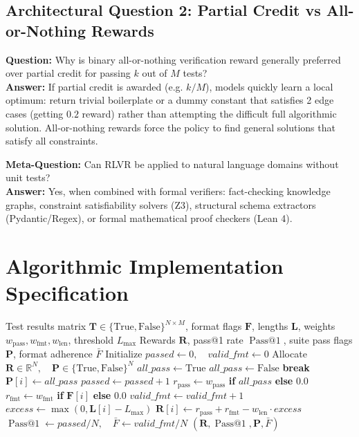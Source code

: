 \documentclass[11pt,a4paper]{article}
\theoremstyle{definition}
\begin{document}
\subsection{Architectural Question 2: Partial Credit vs All-or-Nothing Rewards}
\textbf{Question:} Why is binary all-or-nothing verification reward generally preferred over partial credit for passing $k$ out of $M$ tests?\\
\textbf{Answer:} If partial credit is awarded (e.g. $k/M$), models quickly learn a local optimum: return trivial boilerplate or a dummy constant that satisfies 2 edge cases (getting $0.2$ reward) rather than attempting the difficult full algorithmic solution. All-or-nothing rewards force the policy to find general solutions that satisfy all constraints.

\textbf{Meta-Question:} Can RLVR be applied to natural language domains without unit tests?\\
\textbf{Answer:} Yes, when combined with formal verifiers: fact-checking knowledge graphs, constraint satisfiability solvers (Z3), structural schema extractors (Pydantic/Regex), or formal mathematical proof checkers (Lean 4).

\section{Algorithmic Implementation Specification}

\begin{algorithm}[H]
\caption{RLVR Verification Reward Evaluation and Benchmark Telemetry}
\begin{algorithmic}[1]
\Require Test results matrix $\mathbf{T} \in \{\text{True}, \text{False}\}^{N \times M}$, format flags $\mathbf{F}$, lengths $\mathbf{L}$, weights $w_{\text{pass}}, w_{\text{fmt}}, w_{\text{len}}$, threshold $L_{\max}$
\Ensure Rewards $\mathbf{R}$, pass@1 rate $\operatorname{Pass@1}$, suite pass flags $\mathbf{P}$, format adherence $\bar{F}$
\State Initialize $passed \gets 0, \quad valid\_fmt \gets 0$
\State Allocate $\mathbf{R} \in \mathbb{R}^N, \quad \mathbf{P} \in \{\text{True}, \text{False}\}^N$
    \State $all\_pass \gets \text{True}$
            \State $all\_pass \gets \text{False}$
            \State \textbf{break}
        \EndIf
    \EndFor
    \State $\mathbf{P}[i] \gets all\_pass$
     \State $passed \gets passed + 1$ \EndIf
    \State $r_{\text{pass}} \gets w_{\text{pass}}$ \textbf{if} $all\_pass$ \textbf{else} $0.0$
    \State $r_{\text{fmt}} \gets w_{\text{fmt}}$ \textbf{if} $\mathbf{F}[i]$ \textbf{else} $0.0$
     \State $valid\_fmt \gets valid\_fmt + 1$ \EndIf
    \State $excess \gets \max(0, \mathbf{L}[i] - L_{\max})$
    \State $\mathbf{R}[i] \gets r_{\text{pass}} + r_{\text{fmt}} - w_{\text{len}} \cdot excess$
\EndFor
\State $\operatorname{Pass@1} \gets passed / N, \quad \bar{F} \gets valid\_fmt / N$
\State \Return $(\mathbf{R}, \operatorname{Pass@1}, \mathbf{P}, \bar{F})$
\end{algorithmic}
\end{algorithm}
\end{document}
